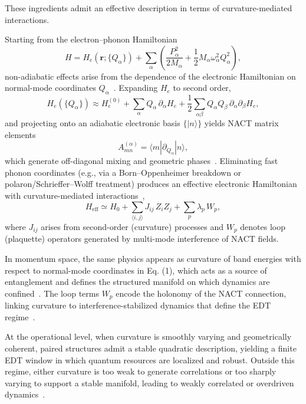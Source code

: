 \documentclass[twocolumn,10pt]{article}
\begin{document}
These ingredients admit an effective description in terms of curvature-mediated interactions. 

Starting from the electron--phonon Hamiltonian
\begin{equation}
H = H_e(\mathbf{r};\{Q_\alpha\}) + \sum_\alpha \left(\frac{P_\alpha^2}{2M_\alpha} + \frac{1}{2} M_\alpha \omega_\alpha^2 Q_\alpha^2\right),
\end{equation}
non-adiabatic effects arise from the dependence of the electronic Hamiltonian on normal-mode coordinates $Q_\alpha$~\cite{BornOppenheimer1927,Mead1979,Yarkony1996}. Expanding $H_e$ to second order,
\begin{equation}
H_e(\{Q_\alpha\}) \approx H_e^{(0)} + \sum_\alpha Q_\alpha \,\partial_\alpha H_e
+ \frac{1}{2}\sum_{\alpha\beta} Q_\alpha Q_\beta \,\partial_\alpha \partial_\beta H_e,
\end{equation}
and projecting onto an adiabatic electronic basis $\{|n\rangle\}$ yields NACT matrix elements
\begin{equation}
A^{(\alpha)}_{mn} = \langle m | \partial_{Q_\alpha} | n \rangle,
\end{equation}
which generate off-diagonal mixing and geometric phases~\cite{Mead1979,Berry1984}. Eliminating fast phonon coordinates (e.g., via a Born--Oppenheimer breakdown or polaron/Schrieffer--Wolff treatment) produces an effective electronic Hamiltonian with curvature-mediated interactions~\cite{SchriefferWolff1966,LangFirsov1962},
\begin{equation}
H_{\mathrm{eff}} \simeq H_0 + \sum_{\langle i,j\rangle} J_{ij}\, Z_i Z_j
+ \sum_p \lambda_p\, W_p,
\end{equation}
where $J_{ij}$ arises from second-order (curvature) processes and $W_p$ denotes loop (plaquette) operators generated by multi-mode interference of NACT fields.

In momentum space, the same physics appears as curvature of band energies with respect to normal-mode coordinates in Eq. (1), which acts as a source of entanglement and defines the structured manifold on which dynamics are confined~\cite{BardeenPines1955,BCS1957}. The loop terms $W_p$ encode the holonomy of the NACT connection, linking curvature to interference-stabilized dynamics that define the EDT regime~\cite{Berry1984,Xiao2010}.

At the operational level, when curvature is smoothly varying and geometrically coherent, paired structures admit a stable quadratic description, yielding a finite EDT window in which quantum resources are localized and robust. Outside this regime, either curvature is too weak to generate correlations or too sharply varying to support a stable manifold, leading to weakly correlated or overdriven dynamics~\cite{Larkin1969,Swingle2018}.
\end{document}
